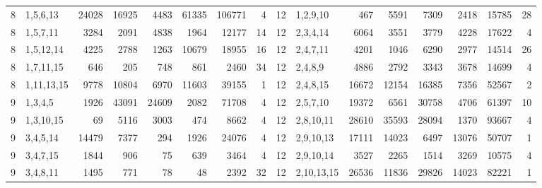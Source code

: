 \begin{table}[tp]
\begin{ruledtabular}
\begin{tabular}{rlrrrrrr@{\hspace{2.2em}}rlrrrrrr}
8 & 1,5,6,13 & 24028 & 16925 & 4483 & 61335 & 106771 & 4 & 12 & 1,2,9,10 & 467 & 5591 & 7309 & 2418 & 15785 & 28 \\
8 & 1,5,7,11 & 3284 & 2091 & 4838 & 1964 & 12177 & 14 & 12 & 2,3,4,14 & 6064 & 3551 & 3779 & 4228 & 17622 & 4 \\
8 & 1,5,12,14 & 4225 & 2788 & 1263 & 10679 & 18955 & 16 & 12 & 2,4,7,11 & 4201 & 1046 & 6290 & 2977 & 14514 & 26 \\
8 & 1,7,11,15 & 646 & 205 & 748 & 861 & 2460 & 34 & 12 & 2,4,8,9 & 4886 & 2792 & 3343 & 3678 & 14699 & 4 \\
8 & 1,11,13,15 & 9778 & 10804 & 6970 & 11603 & 39155 & 1 & 12 & 2,4,8,15 & 16672 & 12154 & 16385 & 7356 & 52567 & 2 \\
9 & 1,3,4,5 & 1926 & 43091 & 24609 & 2082 & 71708 & 4 & 12 & 2,5,7,10 & 19372 & 6561 & 30758 & 4706 & 61397 & 10 \\
9 & 1,3,10,15 & 69 & 5116 & 3003 & 474 & 8662 & 4 & 12 & 2,8,10,11 & 28610 & 35593 & 28094 & 1370 & 93667 & 4 \\
9 & 3,4,5,14 & 14479 & 7377 & 294 & 1926 & 24076 & 4 & 12 & 2,9,10,13 & 17111 & 14023 & 6497 & 13076 & 50707 & 1 \\
9 & 3,4,7,15 & 1844 & 906 & 75 & 639 & 3464 & 4 & 12 & 2,9,10,14 & 3527 & 2265 & 1514 & 3269 & 10575 & 4 \\
9 & 3,4,8,11 & 1495 & 771 & 78 & 48 & 2392 & 32 & 12 & 2,10,13,15 & 26536 & 11836 & 29826 & 14023 & 82221 & 1 \\
\end{tabular}
\end{ruledtabular}
\end{table}

